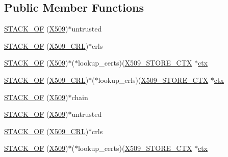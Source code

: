 \subsection*{Public Member Functions}
\begin{DoxyCompactItemize}
\item 
\hyperlink{structx509__store__ctx__st_abb2d4854734b99edced151b7f4d56fd4}{S\+T\+A\+C\+K\+\_\+\+OF} (\hyperlink{crypto_2ossl__typ_8h_a4f666bde6518f95deb3050c54b408416}{X509})$\ast$untrusted
\item 
\hyperlink{structx509__store__ctx__st_a7d14f2c93b6c0cc3fc3e90a478933aa3}{S\+T\+A\+C\+K\+\_\+\+OF} (\hyperlink{crypto_2ossl__typ_8h_ac8661d2485c2c8da5fd7dd26b846f4bf}{X509\+\_\+\+C\+RL})$\ast$crls
\item 
\hyperlink{structx509__store__ctx__st_ab655f200d55c97ff0ce135f73c380ee0}{S\+T\+A\+C\+K\+\_\+\+OF} (\hyperlink{crypto_2ossl__typ_8h_a4f666bde6518f95deb3050c54b408416}{X509})$\ast$($\ast$lookup\+\_\+certs)(\hyperlink{crypto_2ossl__typ_8h_ae681945a2cf88d6337137dc0260a1545}{X509\+\_\+\+S\+T\+O\+R\+E\+\_\+\+C\+TX} $\ast$\hyperlink{structx509__store__ctx__st_aa973d937ba47a33a68291d398736da71}{ctx}
\item 
\hyperlink{structx509__store__ctx__st_ad960bc9ea0ddcd853b39bfb99f6af6e0}{S\+T\+A\+C\+K\+\_\+\+OF} (\hyperlink{crypto_2ossl__typ_8h_ac8661d2485c2c8da5fd7dd26b846f4bf}{X509\+\_\+\+C\+RL})$\ast$($\ast$lookup\+\_\+crls)(\hyperlink{crypto_2ossl__typ_8h_ae681945a2cf88d6337137dc0260a1545}{X509\+\_\+\+S\+T\+O\+R\+E\+\_\+\+C\+TX} $\ast$\hyperlink{structx509__store__ctx__st_aa973d937ba47a33a68291d398736da71}{ctx}
\item 
\hyperlink{structx509__store__ctx__st_a04c95f35f78e81827e34051ad378504e}{S\+T\+A\+C\+K\+\_\+\+OF} (\hyperlink{crypto_2ossl__typ_8h_a4f666bde6518f95deb3050c54b408416}{X509})$\ast$chain
\item 
\hyperlink{structx509__store__ctx__st_abb2d4854734b99edced151b7f4d56fd4}{S\+T\+A\+C\+K\+\_\+\+OF} (\hyperlink{crypto_2ossl__typ_8h_a4f666bde6518f95deb3050c54b408416}{X509})$\ast$untrusted
\item 
\hyperlink{structx509__store__ctx__st_a7d14f2c93b6c0cc3fc3e90a478933aa3}{S\+T\+A\+C\+K\+\_\+\+OF} (\hyperlink{crypto_2ossl__typ_8h_ac8661d2485c2c8da5fd7dd26b846f4bf}{X509\+\_\+\+C\+RL})$\ast$crls
\item 
\hyperlink{structx509__store__ctx__st_ab655f200d55c97ff0ce135f73c380ee0}{S\+T\+A\+C\+K\+\_\+\+OF} (\hyperlink{crypto_2ossl__typ_8h_a4f666bde6518f95deb3050c54b408416}{X509})$\ast$($\ast$lookup\+\_\+certs)(\hyperlink{crypto_2ossl__typ_8h_ae681945a2cf88d6337137dc0260a1545}{X509\+\_\+\+S\+T\+O\+R\+E\+\_\+\+C\+TX} $\ast$\hyperlink{structx509__store__ctx__st_aa973d937ba47a33a68291d398736da71}{ctx}

\end{DoxyCompactItemize}
